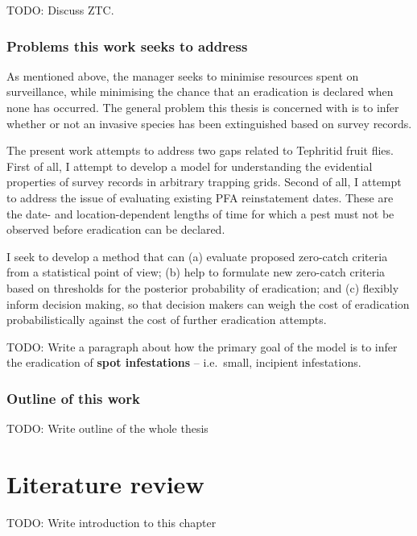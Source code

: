 \documentclass[
]{book}
\begin{document}
TODO: Discuss ZTC.

\hypertarget{problems-this-work-seeks-to-address}{%
\subsection{Problems this work seeks to address}\label{problems-this-work-seeks-to-address}}

As mentioned above, the manager seeks to minimise resources spent on surveillance, while minimising the chance that an eradication is declared when none has occurred. The general problem this thesis is concerned with is to infer whether or not an invasive species has been extinguished based on survey records.

The present work attempts to address two gaps related to Tephritid fruit flies. First of all, I attempt to develop a model for understanding the evidential properties of survey records in arbitrary trapping grids. Second of all, I attempt to address the issue of evaluating existing PFA reinstatement dates. These are the date- and location-dependent lengths of time for which a pest must not be observed before eradication can be declared.

I seek to develop a method that can (a) evaluate proposed zero-catch criteria from a statistical point of view; (b) help to formulate new zero-catch criteria based on thresholds for the posterior probability of eradication; and (c) flexibly inform decision making, so that decision makers can weigh the cost of eradication probabilistically against the cost of further eradication attempts.

TODO: Write a paragraph about how the primary goal of the model is to infer the eradication of \textbf{spot infestations} -- i.e.~small, incipient infestations.

\hypertarget{outline-of-this-work}{%
\subsection{Outline of this work}\label{outline-of-this-work}}

TODO: Write outline of the whole thesis

\hypertarget{lit-review}{%
\chapter{Literature review}\label{lit-review}}

TODO: Write introduction to this chapter
\end{document}
